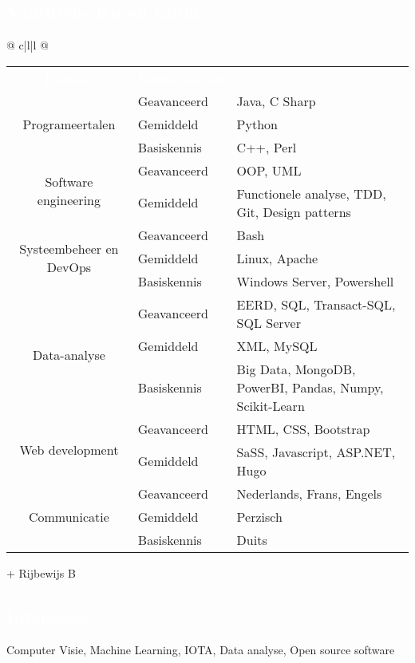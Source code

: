 \documentclass[a4paper, twoside]{article}
\begin{document}
\begin{mdframed}
\section*{\textcolor{white}{ Vaardigheden en kennis }}
\end{mdframed}
\noindent
\begin{tabu}{@{} c|l|l @{}}
\begin{tabular}{c|l|l @{}}
\cellcolor{blueDark}\textcolor{white}{\textbf{ Domein }} &
\cellcolor{blueDark}\textcolor{white}{\textbf{ Kennisniveau }} &
\cellcolor{blueDark}\\
\multirow{ 3 }{*}{ Programeertalen }
& Geavanceerd & Java, C Sharp \\
& Gemiddeld & Python \\
& Basiskennis & C++, Perl \\
\hline
\multirow{ 2 }{*}{ Software engineering }
& Geavanceerd & OOP, UML \\
& Gemiddeld & Functionele analyse, TDD, Git, Design patterns \\
\hline
\multirow{ 3 }{*}{ Systeembeheer en DevOps }
& Geavanceerd & Bash \\
& Gemiddeld & Linux, Apache \\
& Basiskennis & Windows Server, Powershell \\
\hline
\multirow{ 3 }{*}{ Data-analyse }
& Geavanceerd & EERD, SQL, Transact-SQL, SQL Server \\
& Gemiddeld & XML, MySQL \\
& Basiskennis & Big Data, MongoDB, PowerBI, Pandas, Numpy, Scikit-Learn \\
\hline
\multirow{ 2 }{*}{ Web development }
& Geavanceerd & HTML, CSS, Bootstrap \\
& Gemiddeld & SaSS, Javascript, ASP.NET, Hugo \\
\hline
\multirow{ 3 }{*}{ Communicatie }
& Geavanceerd & Nederlands, Frans, Engels \\
& Gemiddeld & Perzisch \\
& Basiskennis & Duits \\
\hline
\end{tabular}
\end{tabu}
\ignorespaces
\noindent + Rijbewijs B
\begin{mdframed}
\section*{\textcolor{white}{ Interesses }}
\end{mdframed}
\noindent
Computer Visie, Machine Learning, IOTA, Data analyse, Open source software
\end{document}
